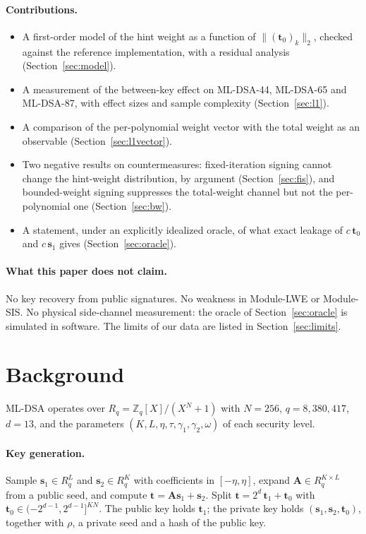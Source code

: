 \documentclass{article}
\newcommand{\sz}{\mathbf{s}_2}
\newcommand{\sone}{\mathbf{s}_1}
\newcommand{\tzero}{\mathbf{t}_0}
\newcommand{\tone}{\mathbf{t}_1}
\newcommand{\boldA}{\mathbf{A}}
\begin{document}
\paragraph{Contributions.}
\begin{itemize}[leftmargin=*]
  \item A first-order model of the hint weight as a function of
        $\|(\tzero)_k\|_2$, checked against the reference implementation,
        with a residual analysis (Section~\ref{sec:model}).
  \item A measurement of the between-key effect on ML-DSA-44, ML-DSA-65 and
        ML-DSA-87, with effect sizes and sample complexity
        (Section~\ref{sec:l1}).
  \item A comparison of the per-polynomial weight vector with the total
        weight as an observable (Section~\ref{sec:l1vector}).
  \item Two negative results on countermeasures: fixed-iteration signing
        cannot change the hint-weight distribution, by argument
        (Section~\ref{sec:fis}), and
        bounded-weight signing suppresses the total-weight channel but not the
        per-polynomial one (Section~\ref{sec:bw}).
  \item A statement, under an explicitly idealized oracle, of what exact
        leakage of $c\,\tzero$ and $c\,\sone$ gives (Section~\ref{sec:oracle}).
\end{itemize}

\paragraph{What this paper does not claim.}
No key recovery from public signatures.  No weakness in Module-LWE or
Module-SIS.  No physical side-channel measurement: the oracle of
Section~\ref{sec:oracle} is simulated in software.  The limits of our data are
listed in Section~\ref{sec:limits}.

\section{Background}
\label{sec:background}

ML-DSA operates over $R_q = \mathbb{Z}_q[X]/(X^N+1)$ with $N = 256$,
$q = 8{,}380{,}417$, $d = 13$, and the parameters
$(K, L, \eta, \tau, \gamma_1, \gamma_2, \omega)$ of each security level.

\paragraph{Key generation.}
Sample $\sone \in R_q^L$ and $\sz \in R_q^K$ with coefficients in
$[-\eta, \eta]$, expand $\boldA \in R_q^{K \times L}$ from a public seed, and
compute $\mathbf{t} = \boldA \sone + \sz$.  Split
$\mathbf{t} = 2^d\,\tone + \tzero$ with
$\tzero \in (-2^{d-1}, 2^{d-1}]^{KN}$.  The public key holds $\tone$; the private
key holds $(\sone, \sz, \tzero)$, together with $\rho$, a private seed and a hash of the
public key.
\end{document}
